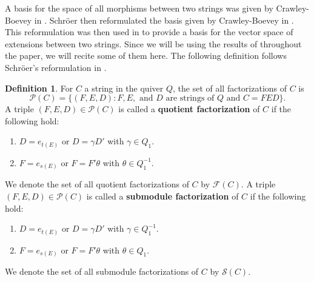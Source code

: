 \documentclass[12pt]{amsart}
\theoremstyle{plain}
\newtheorem{thm}{Theorem}[section]
\theoremstyle{definition}
\newtheorem{defn}{Definition}[section]
\theoremstyle{remark}
\begin{document}

{\color{black}
A basis for the space of all morphisms between two strings was given by Crawley-Boevey in \cite{CBstrings}. Schr{\"o}er then reformulated the basis given by Crawley-Boevey in \cite{schroer1999modules}. This reformulation was then used in \cite{brustle2020combinatorics} to provide a basis for the vector space of extensions between two strings. Since we will be using the results of \cite{brustle2020combinatorics} throughout the paper, we will recite some of them here. The following definition follows Schr{\"o}er's reformulation in \cite{schroer1999modules}.

\begin{defn}
For $C$ a string in the quiver $Q$, the set of all factorizations of $C$ is $$\mathcal{P}(C) = \{(F,E,D) : F, E, \text{ and } D \text{ are strings of $Q$ and $C = FED$} \}.$$ A triple $(F,E,D) \in \mathcal{P}(C)$ is called a \textbf{quotient factorization} of $C$ if the following hold:
\begin{enumerate}
\item $D = e_{t(E)}$ or $D = \gamma D'$ with $\gamma \in Q_1$.
\item $F = e_{s(E)}$ or $F = F'\theta$ with $\theta \in Q_1^{-1}$.
\end{enumerate} 
We denote the set of all quotient factorizations of $C$ by $\mathcal{F}(C)$. A triple $(F,E,D) \in \mathcal{P}(C)$ is called a \textbf{submodule factorization} of $C$ if the following hold:
\begin{enumerate}
\item $D = e_{t(E)}$ or $D = \gamma D'$ with $\gamma \in Q_1^{-1}$.
\item $F = e_{s(E)}$ or $F = F'\theta$ with $\theta \in Q_1$.
\end{enumerate} 
We denote the set of all submodule factorizations of $C$ by $\mathcal{S}(C)$.
\end{defn}

}
\end{document}
